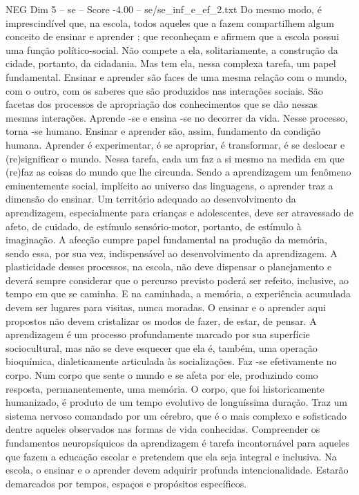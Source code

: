 \begin{textsample}{NEG Dim 5 – se – Score -4.00 – se/se\_inf\_e\_ef\_2.txt}
Do mesmo modo, é imprescindível que, na escola, todos aqueles que a fazem compartilhem algum conceito de ensinar e aprender ; que reconheçam e afirmem que a escola possui uma função político-social.
Não compete a ela, solitariamente, a construção da cidade, portanto, da cidadania.
Mas tem ela, nessa complexa tarefa, um papel fundamental.
Ensinar e aprender são faces de uma mesma relação com o mundo, com o outro, com os saberes que são produzidos nas interações sociais.
São facetas dos processos de apropriação dos conhecimentos que se dão nessas mesmas interações.
Aprende -se e ensina -se no decorrer da vida.
Nesse processo, torna -se humano.
Ensinar e aprender são, assim, fundamento da condição humana.
Aprender é experimentar, é se apropriar, é transformar, é se deslocar e (re)significar o mundo.
Nessa tarefa, cada um faz a si mesmo na medida em que (re)faz as coisas do mundo que lhe circunda.
Sendo a aprendizagem um fenômeno eminentemente social, implícito ao universo das linguagens, o aprender traz a dimensão do ensinar.
Um território adequado ao desenvolvimento da aprendizagem, especialmente para crianças e adolescentes, deve ser atravessado de afeto, de cuidado, de estímulo sensório-motor, portanto, de estímulo à imaginação.
A afecção cumpre papel fundamental na produção da memória, sendo essa, por sua vez, indispensável ao desenvolvimento da aprendizagem.
A plasticidade desses processos, na escola, não deve dispensar o planejamento e deverá sempre considerar que o percurso previsto poderá ser refeito, inclusive, ao tempo em que se caminha.
E na caminhada, a memória, a experiência acumulada devem ser lugares para visitas, nunca moradas.
O ensinar e o aprender aqui propostos não devem cristalizar os modos de fazer, de estar, de pensar.
A aprendizagem é um processo profundamente marcado por sua superfície sociocultural, mas não se deve esquecer que ela é, também, uma operação bioquímica, dialeticamente articulada às socializações.
Faz -se efetivamente no corpo.
Num corpo que sente o mundo e se afeta por ele, produzindo como resposta, permanentemente, uma memória.
O corpo, que foi historicamente humanizado, é produto de um tempo evolutivo de longuíssima duração.
Traz um sistema nervoso comandado por um cérebro, que é o mais complexo e sofisticado dentre aqueles observados nas formas de vida conhecidas.
Compreender os fundamentos neuropsíquicos da aprendizagem é tarefa incontornável para aqueles que fazem a educação escolar e pretendem que ela seja integral e inclusiva.
Na escola, o ensinar e o aprender devem adquirir profunda intencionalidade.
Estarão demarcados por tempos, espaços e propósitos específicos.

\end{textsample}
